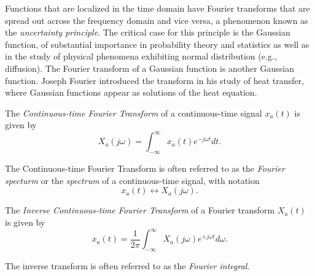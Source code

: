 \documentclass[\documentfontsize, twocolumn]{\classname}
\begin{document}
Functions that are localized in the time domain have Fourier transforms that are spread out across the frequency domain and vice versa, a phenomenon known as the \emph{uncertainty principle}. The critical case for this principle is the Gaussian function, of substantial importance in probability theory and statistics as well as in the study of physical phenomena exhibiting normal distribution (e.g., diffusion). The Fourier transform of a Gaussian function is another Gaussian function. Joseph Fourier introduced the transform in his study of heat transfer, where Gaussian functions appear as solutions of the heat equation.

\begin{defin}
    The \emph{Continuous-time Fourier Transform} of a continuous-time signal $x_a(t)$ is given by
    \begin{equation}\label{eqn:continuousTimeFourierTransform}
        X_a(j\omega) = \int_{-\infty}^\infty x_a(t) e^{-j\omega t} dt.
    \end{equation}
\end{defin}

The Continuous-time Fourier Transform is often referred to as the \emph{Fourier specturm} or the \emph{spectrum} of a continuous-time signal, with notation \[ x_a(t) \longleftrightarrow X_a(j\omega).\]

\begin{defin}
    The \emph{Inverse Continuous-time Fourier Transform} of a Fourier transform $X_a(t)$ is given by
    \begin{equation}\label{eqn:inverseContinuousTimeFourierTransform}
        x_a(t) = \frac 1 {2\pi} \int_{-\infty}^\infty X_a(j\omega) e^{+j\omega t} d\omega.
    \end{equation}
\end{defin}

The inverse transform is often referred to as the \emph{Fourier integral}.
\end{document}
